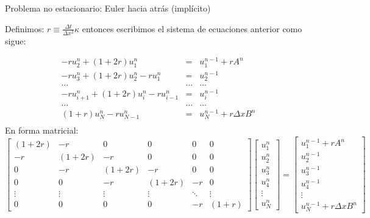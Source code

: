 \documentclass[handout]{beamer}
\begin{document}
\begin{frame}{Problema no estacionario: Euler hacia atr\'as (impl\'icito)}

\begin{footnotesize}
Definimos: $\displaystyle r \equiv \frac{\Delta t}{\Delta x^2} \kappa$ entonces escribimos el sistema de ecuaciones anterior como sigue:

\begin{eqnarray*}
-r u_{2}^{n} + (1+2r) u_{1}^{n} & = & u_{1}^{n-1} + r A^{n}\\
-r u_{3}^{n} + (1+2r) u_{2}^{n} - r u_{1}^{n} & = & u_{2}^{n-1} \\
\dots & \dots & \dots \\
-r u_{i+1}^{n} + (1+2r) u_{i}^{n} - r u_{i-1}^{n} & = & u_{i}^{n-1} \\
\dots & \dots & \dots \\
(1+r) u_{N}^{n} - r u_{N-1}^{n} & = & u_{N}^{n-1} + r \Delta x B^{n}\\
\end{eqnarray*}
\pause 
En forma matricial:
\[
\left[
\begin{matrix}
(1+2r) & -r     & 0      & 0      & 0      & 0  \\
-r     & (1+2r) & -r     & 0      & 0      & 0  \\
0      & -r     & (1+2r) & -r     & 0      & 0  \\
0      & 0      & -r     & (1+2r) & -r     & 0  \\
\vdots & \vdots & \vdots & \vdots & \ddots & \vdots \\
0      & 0      & 0      & 0      & -r     & (1+r) 
\end{matrix}
\right] \left[
\begin{matrix}
u_{1}^{n} \\ u_{2}^{n} \\u_{3}^{n} \\u_{4}^{n} \\ \vdots \\u_{N}^{n}
\end{matrix}
\right] = \left[
\begin{matrix}
u_{1}^{n-1} + rA^{n} \\ u_{2}^{n-1} \\u_{3}^{n-1} \\u_{4}^{n-1} \\ \vdots \\u_{N}^{n-1} + r\Delta x B^{n}
\end{matrix}
\right]
\]
\end{footnotesize}

\end{frame}
\end{document}
